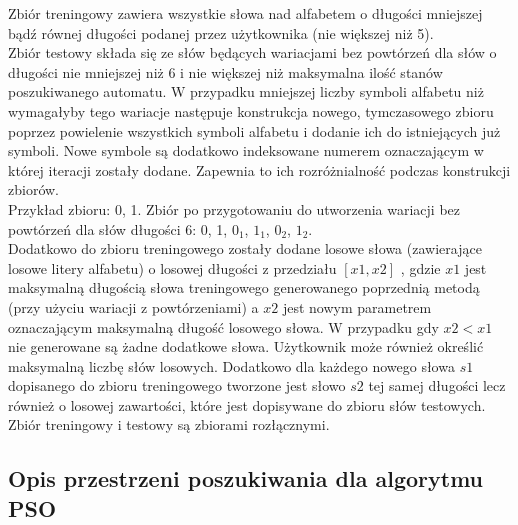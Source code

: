 \documentclass[runningheads,a4paper]{llncs}
\begin{document}
Zbiór treningowy zawiera wszystkie słowa nad alfabetem o długości mniejszej bądź równej długości podanej przez użytkownika (nie większej niż 5). \\

Zbiór testowy składa się ze słów będących wariacjami bez powtórzeń dla słów o  długości nie mniejszej niż 6 i nie większej niż maksymalna ilość stanów poszukiwanego automatu. W przypadku mniejszej liczby symboli alfabetu niż wymagałyby tego wariacje następuje konstrukcja nowego, tymczasowego zbioru poprzez powielenie wszystkich symboli alfabetu i dodanie ich do istniejących już symboli. Nowe symbole są dodatkowo indeksowane numerem oznaczającym w której iteracji zostały dodane. Zapewnia to ich rozróżnialność podczas konstrukcji zbiorów.\\

Przykład zbioru: {0, 1}. 
Zbiór po przygotowaniu do utworzenia wariacji bez powtórzeń dla słów długości 6: {0, 1, $0_{1}$, $1_{1}$, $0_{2}$, $1_{2}$}. \\

Dodatkowo do zbioru treningowego zostały dodane losowe słowa (zawierające losowe litery alfabetu) o losowej długości z przedziału $[x1,x2]$ , gdzie $x1$ jest maksymalną długością słowa treningowego generowanego poprzednią metodą (przy użyciu wariacji z powtórzeniami) a $x2$ jest nowym parametrem oznaczającym maksymalną długość losowego słowa. W przypadku gdy $x2 < x1$ nie generowane są żadne dodatkowe słowa. Użytkownik może również określić maksymalną liczbę słów losowych. Dodatkowo dla każdego nowego słowa $s1$ dopisanego do zbioru treningowego tworzone jest słowo $s2$ tej samej długości lecz również o losowej zawartości, które jest dopisywane do zbioru słów testowych. \\

Zbiór treningowy i testowy są zbiorami rozłącznymi.\\

\subsection{Opis przestrzeni poszukiwania dla algorytmu PSO}
\end{document}
